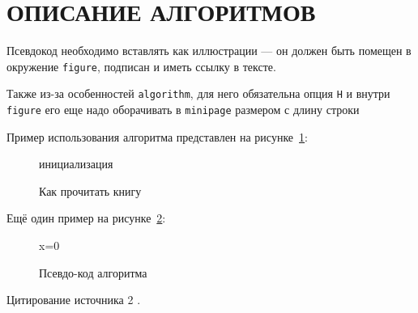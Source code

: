 \section{ОПИСАНИЕ АЛГОРИТМОВ}

Псевдокод необходимо вставлять как иллюстрации --- он должен быть помещен в окружение \texttt{figure}, подписан и иметь ссылку в тексте.

Также из-за особенностей \texttt{algorithm}, для него обязательна опция \texttt{H} и внутри \texttt{figure} его еще надо оборачивать в \texttt{minipage} размером с длину строки

Пример использования алгоритма представлен на рисунке~\ref{alg:alg1}:

\begin{figure}
\begin{minipage}{\linewidth}
\begin{algorithm}[H]  
    \SetAlgoVlined
    инициализация\;
\end{algorithm}
\end{minipage}
\caption{Как прочитать книгу}
\label{alg:alg1}
\end{figure}

\pagebreak

Ещё один пример на рисунке~\ref{alg:generalGP}:

\begin{figure}
\begin{minipage}{\linewidth}
\begin{algorithm}[H]
	\SetAlgoVlined %
	
	x=0\;
	\While{ $\tau_{norm} > \varepsilon_{tol}$ }{
		$s_{k-1} \leftarrow x_k - x_{k-1}$\;
		\tcc{Step lenght computation:} %
		\eIf{$k$ is even}{
			$ \alpha_k^{ABB} = \frac{ s_{k-1}^T y_{k-1}}{y_{k-1}^T y_{k-1}}$\;
		}{ %
		$\alpha_k^{ABB} = \frac{ s_{k-1}^T s_{k-1}}{s_{k-1}^T y_{k-1}}$\;
	} %
	$k \leftarrow k + 1$\;
	\For{ i = 1}{
		$x_{i+1} = P_\Omega(x_i - \alpha_k^{ABB}*g_k)$\;
	} %
	\tcc{Compute the termination constant} %
	$\tau_{norm} = abs ( ||x_{k}||_2 - ||x_{k-1}||_2)$\;
} %
\end{algorithm}
\end{minipage}
\caption{Псевдо-код алгоритма}
\label{alg:generalGP}
\end{figure}

Цитирование источника 2 \cite{cite_1_10}.
